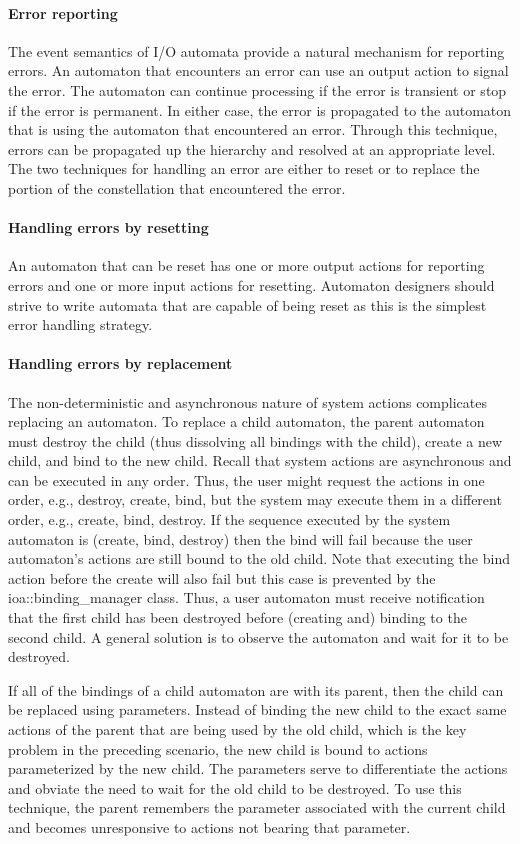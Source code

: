 \paragraph*{Error reporting}
The event semantics of I/O automata provide a natural mechanism for reporting errors.
An automaton that encounters an error can use an output action to signal the error.
The automaton can continue processing if the error is transient or stop if the error is permanent.
In either case, the error is propagated to the automaton that is using the automaton that encountered an error.
Through this technique, errors can be propagated up the hierarchy and resolved at an appropriate level.
The two techniques for handling an error are either to reset or to replace the portion of the constellation that encountered the error.

\paragraph*{Handling errors by resetting}
An automaton that can be reset has one or more output actions for reporting errors and one or more input actions for resetting.
Automaton designers should strive to write automata that are capable of being reset as this is the simplest error handling strategy.

\paragraph*{Handling errors by replacement}
The non-deterministic and asynchronous nature of system actions complicates replacing an automaton.
To replace a child automaton, the parent automaton must destroy the child (thus dissolving all bindings with the child), create a new child, and bind to the new child.
Recall that system actions are asynchronous and can be executed in any order.
Thus, the user might request the actions in one order, e.g., destroy, create, bind, but the system may execute them in a different order, e.g., create, bind, destroy.
If the sequence executed by the system automaton is (create, bind, destroy) then the bind will fail because the user automaton's actions are still bound to the old child.
Note that executing the bind action before the create will also fail but this case is prevented by the ioa::binding\_manager class.
Thus, a user automaton must receive notification that the first child has been destroyed before (creating and) binding to the second child.
A general solution is to observe the automaton and wait for it to be destroyed.

If all of the bindings of a child automaton are with its parent, then the child can be replaced using parameters.
Instead of binding the new child to the exact same actions of the parent that are being used by the old child, which is the key problem in the preceding scenario, the new child is bound to actions parameterized by the new child.
The parameters serve to differentiate the actions and obviate the need to wait for the old child to be destroyed.
To use this technique, the parent remembers the parameter associated with the current child and becomes unresponsive to actions not bearing that parameter.
